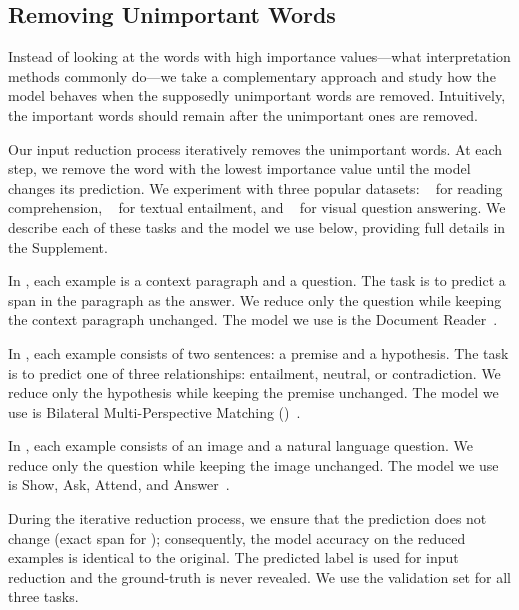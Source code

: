 \subsection{Removing Unimportant Words}

Instead of looking at the words with high importance values---what
interpretation methods commonly do---we take a complementary approach and study
how the model behaves when the supposedly unimportant words are removed.  
Intuitively, the important words should remain after the unimportant ones are
removed.

Our input reduction process iteratively removes the unimportant words. At each step,
we remove the word with the lowest importance value until the model changes its
prediction.
We experiment with three popular datasets:
\squad~\cite{rajpurkar2016squad} for reading comprehension,
\snli~\cite{bowman2015snli} for textual entailment,
and \vqa~\cite{antol2015vqa} for visual question answering. We describe each of
these tasks and the model we use below, providing full details in the
Supplement.

In \squad, each example is a context paragraph and a question. The task is to
predict a span in the paragraph as the answer.  We reduce only the question
while keeping the context paragraph unchanged. The model we use is the
 Document Reader~\cite{chen2017drqa}.

In \snli, each example consists of two sentences: a premise and a hypothesis.
The task is to predict one of three relationships: entailment, neutral, or
contradiction. We reduce only the hypothesis while keeping the premise
unchanged.  The model we use is Bilateral Multi-Perspective
Matching ()~\cite{wang2017bilateral}.

In \vqa, each example consists of an image and a natural language question.
We reduce only the question while keeping the image unchanged. The model we use
is Show, Ask, Attend, and Answer~\cite{kazemi2017show}.

During the iterative reduction process, we ensure that the prediction does not
change (exact span for \squad{}); consequently, the model accuracy
on the reduced examples is identical to the original. The predicted label is
used for input reduction and the ground-truth is never revealed. We use the
validation set for all three tasks.

